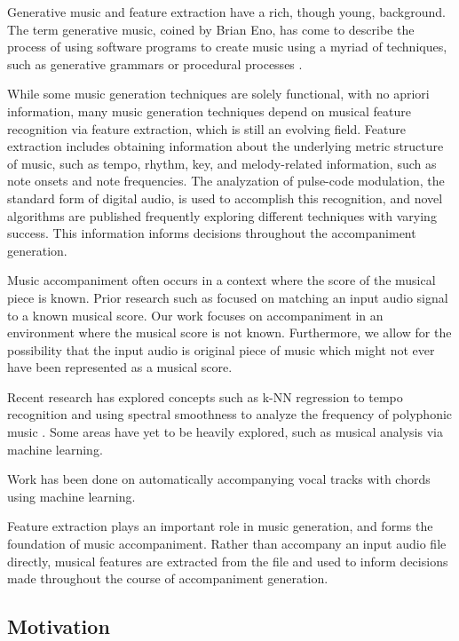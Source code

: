 \documentclass[11pt,conference,letterpaper]{IEEEtran}
\begin{document}
Generative music and feature extraction have a rich, though young, background. The term generative music, coined by Brian Eno, has come to describe the process of using software programs to create music using a myriad of techniques, such as generative grammars or procedural processes \cite{wooller2005framework}.

While some music generation techniques are solely functional, with no apriori information, many music generation techniques depend on musical feature recognition via feature extraction, which is still an evolving field. Feature extraction includes obtaining information about the underlying metric structure of music, such as tempo, rhythm, key, and melody-related information, such as note onsets and note frequencies. The analyzation of pulse-code modulation, the standard form of digital audio, is used to accomplish this recognition, and novel algorithms are published frequently exploring different techniques with varying success. This information informs decisions throughout the accompaniment generation. 

Music accompaniment often occurs in a context where the score of the musical piece is known. Prior research such as \cite{dannenberg1984line} focused on matching an input audio signal to a known musical score. Our work focuses on accompaniment in an environment where the musical score is not known. Furthermore, we allow for the possibility that the input audio is original piece of music which might not ever have been represented as a musical score.

Recent research has explored concepts such as k-NN regression to tempo recognition \cite{eronen2010music} and using spectral smoothness to analyze the frequency of polyphonic music \cite{klapuri2003multiple}. Some areas have yet to be heavily explored, such as musical analysis via machine learning.

Work has been done on automatically accompanying vocal tracks with chords \cite{simon2008mysong} using machine learning. \cite{morris2008exposing}

Feature extraction plays an important role in music generation, and forms the foundation of music accompaniment. Rather than accompany an input audio file directly, musical features are extracted from the file and used to inform decisions made throughout the course of accompaniment generation.

\subsection{Motivation}
\end{document}
